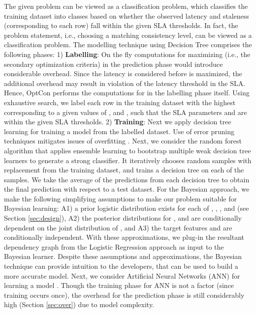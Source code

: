 \documentclass[conference]{IEEEtran}
\begin{document}
The given problem can be viewed as a classification problem, which classifies the training dataset into
classes based on whether the observed latency and staleness (corresponding to each row) fall within the given
SLA thresholds. In fact, the problem statement, i.e., choosing a matching consistency level, can be viewed as
a classification problem. The modelling technique using Decision Tree comprises the following phases: 1) \textbf{Labelling}: On the fly computations for maximizing  (i.e., the secondary optimization criteria) in the prediction phase would introduce
considerable overhead. Since the latency is considered before  is maximized, the additional overhead may result in violation of the latency threshold in the SLA. Hence, OptCon performs the computations for  in the labelling phase itself.  Using exhaustive search, we label each row in the training dataset with the highest  corresponding to a given values of ,  and , such that the SLA parameters  and  are within the given SLA thresholds. 2) \textbf{Training}: Next we apply decision tree learning for training a model  from the labelled dataset. Use of error pruning techniques mitigates issues of overfitting \cite{Flach:2012:MLA:2490546}.
 Next, we consider the random forest algorithm that applies ensemble learning to bootstrap multiple weak decision tree learners to generate a strong classifier. It iteratively chooses random samples with replacement from the training dataset, and trains a decision tree on each of the samples. We take the average of the predictions from each decision tree to obtain the final prediction with respect to a test dataset.
  For the Bayesian approach, we make the following simplifying assumptions to make our problem suitable for Bayesian learning: A1) a prior logistic distribution exists for each of , , , and  (see Section \ref{sec:design}), A2) the
 posterior distributions for
    , and  are conditionally dependent on the joint distribution of , and A3) the target features  and  are conditionally independent.
     With these approximations, we plug-in the resultant dependency graph from the Logistic Regression approach as input to the Bayesian learner. Despite these assumptions and approximations, the Bayesian technique can provide intuition to the developers, that can be used to build a more accurate model. Next, we consider Artificial Neural Networks (ANN) for learning a model . Though the training phase for ANN is not a factor (since training occurs once), the overhead for the prediction phase is still considerably high (Section \ref{sec:over}) due to model complexity.
\end{document}
